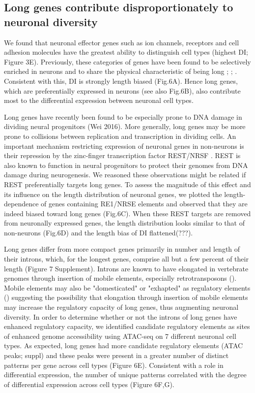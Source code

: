 \subsection{Long genes contribute disproportionately to neuronal diversity}

We found that neuronal effector genes such as ion channels, receptors and cell adhesion molecules have the greatest ability to distinguish cell types (highest DI; Figure 3E). Previously, these categories of genes have been found to be selectively enriched in neurons and to share the physical characteristic of being long \cite{Sugino_2014}; \cite{Gabel_2015}; \cite{Zylka_2015}. Consistent with this, DI is strongly length biased (Fig.6A). Hence long genes, which are preferentially expressed in neurons (see also Fig.6B), also contribute most to the differential expression between neuronal cell types. 

Long genes have recently been found to be especially prone to DNA damage in dividing neural progenitors (Wei 2016). More generally, long genes may be more prone to collisions between replication and transcription in dividing cells. An important mechanism restricting expression of neuronal genes in non-neurons is their repression by the zinc-finger transcription factor REST/NRSF \cite{RN1}\cite{RN2a}. REST is also known to function in neural progenitors to protect their genomes from DNA damage during neurogenesis\cite{Nechiporuk_2016}. We reasoned these observations might be related if REST preferentially targets long genes. To assess the magnitude of this effect and its influence on the length distribution of neuronal genes, we plotted the length-dependence of genes containing RE1/NRSE elements and observed that they are indeed biased toward long genes (Fig.6C). When these REST targets are removed from neuronally expressed genes, the length distribution looks similar to that of non-neurons (Fig.6D) and the length bias of DI flattened(???).

Long genes differ from more compact genes primarily in number and length of their introns, which, for the longest genes, comprise all but a few percent of their length (Figure 7 Supplement). Introns are known to have elongated in vertebrate genomes through insertion of mobile elements, especially retrotransposons (). Mobile elements may also be "domesticated" or "exhapted" as regulatory elements () suggesting the possibility that elongation through insertion of mobile elements may increase the regulatory capacity of long genes, thus augmenting neuronal diversity. In order to determine whether or not the introns of long genes have enhanced regulatory capacity, we identified candidate regulatory elements as sites of enhanced genome accessibility using ATAC-seq \cite{Buenrostro_2013} on 7 different neuronal cell types. As expected, long genes had more candidate regulatory elements (ATAC peaks; suppl) and these peaks were present in a greater number of distinct patterns per gene across cell types (Figure 6E). Consistent with a role in differential expression, the number of unique patterns correlated with the degree of differential expression across cell types (Figure 6F,G).

